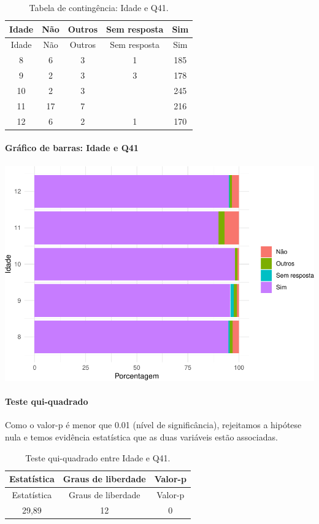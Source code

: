 \documentclass[]{article}
\let\oldparagraph\paragraph
\renewcommand{\paragraph}[1]{\oldparagraph{#1}\mbox{}}
\begin{document}
\begin{longtable}[]{@{}ccccc@{}}
\caption{\label{tab:unnamed-chunk-1626}Tabela de contingência: Idade e Q41.}\tabularnewline
\toprule
Idade & Não & Outros & Sem resposta & Sim\tabularnewline
\midrule
\endfirsthead
\toprule
Idade & Não & Outros & Sem resposta & Sim\tabularnewline
\midrule
\endhead
8 & 6 & 3 & 1 & 185\tabularnewline
9 & 2 & 3 & 3 & 178\tabularnewline
10 & 2 & 3 & & 245\tabularnewline
11 & 17 & 7 & & 216\tabularnewline
12 & 6 & 2 & 1 & 170\tabularnewline
\bottomrule
\end{longtable}

\hypertarget{gruxe1fico-de-barras-idade-e-q41}{%
\paragraph{Gráfico de barras: Idade e Q41}\label{gruxe1fico-de-barras-idade-e-q41}}

\begin{center}\includegraphics[width=0.75\linewidth]{relatorio_covid19_files/figure-latex/unnamed-chunk-1627-1} \end{center}

\hypertarget{teste-qui-quadrado-139}{%
\paragraph{Teste qui-quadrado}\label{teste-qui-quadrado-139}}

Como o valor-p é menor que 0.01 (nível de significância), rejeitamos a hipótese nula e temos evidência estatística que as duas variáveis estão associadas.

\begin{longtable}[]{@{}ccc@{}}
\caption{\label{tab:unnamed-chunk-1629}Teste qui-quadrado entre Idade e Q41.}\tabularnewline
\toprule
Estatística & Graus de liberdade & Valor-p\tabularnewline
\midrule
\endfirsthead
\toprule
Estatística & Graus de liberdade & Valor-p\tabularnewline
\midrule
\endhead
29,89 & 12 & 0\tabularnewline
\bottomrule
\end{longtable}
\end{document}
